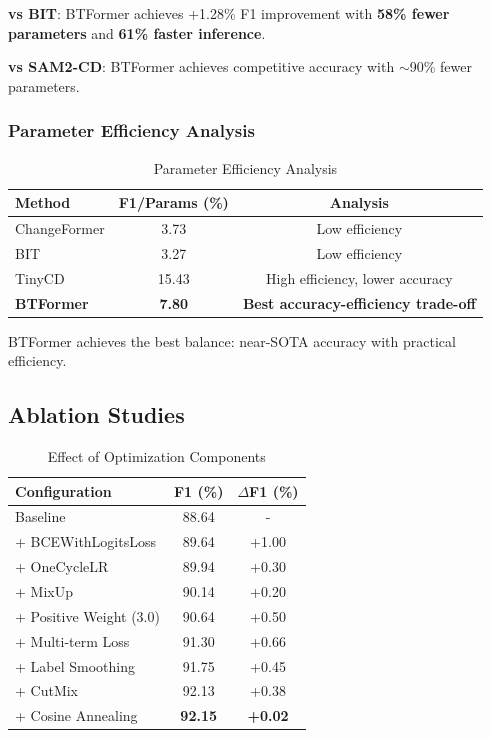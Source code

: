 \documentclass[journal]{IEEEtran}
\begin{document}
\textbf{vs BIT}: BTFormer achieves +1.28\% F1 improvement with \textbf{58\% fewer parameters} and \textbf{61\% faster inference}.

\textbf{vs SAM2-CD}: BTFormer achieves competitive accuracy with $\sim$90\% fewer parameters.

\subsubsection{Parameter Efficiency Analysis}

\begin{table}[h]
\centering
\caption{Parameter Efficiency Analysis}
\label{tab:param_efficiency}
\begin{tabular}{lcc}
\toprule
\textbf{Method} & \textbf{F1/Params (\%)} & \textbf{Analysis} \\
\midrule
ChangeFormer & 3.73 & Low efficiency \\
BIT & 3.27 & Low efficiency \\
TinyCD & 15.43 & High efficiency, lower accuracy \\
\textbf{BTFormer} & \textbf{7.80} & \textbf{Best accuracy-efficiency trade-off} \\
\bottomrule
\end{tabular}
\end{table}

BTFormer achieves the best balance: near-SOTA accuracy with practical efficiency.

\subsection{Ablation Studies}

\begin{table}[h]
\centering
\caption{Effect of Optimization Components}
\label{tab:ablation_optimization}
\begin{tabular}{lcc}
\toprule
\textbf{Configuration} & \textbf{F1 (\%)} & \textbf{$\Delta$F1 (\%)} \\
\midrule
Baseline & 88.64 & - \\
+ BCEWithLogitsLoss & 89.64 & +1.00 \\
+ OneCycleLR & 89.94 & +0.30 \\
+ MixUp & 90.14 & +0.20 \\
+ Positive Weight (3.0) & 90.64 & +0.50 \\
+ Multi-term Loss & 91.30 & +0.66 \\
+ Label Smoothing & 91.75 & +0.45 \\
+ CutMix & 92.13 & +0.38 \\
+ Cosine Annealing & \textbf{92.15} & \textbf{+0.02} \\
\bottomrule
\end{tabular}
\end{table}
\end{document}

